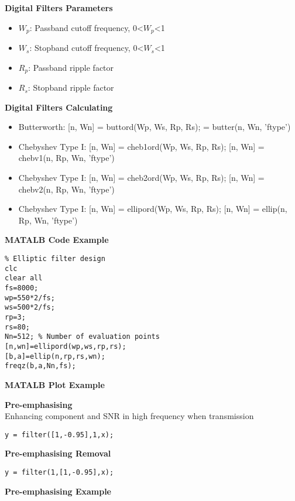 \documentclass[10pt,a4paper,oneside]{beamer}
\begin{document}
\begin{frame}
\vspace{0.5cm}
{\bfseries Digital Filters Parameters}
\begin{itemize}
\item $W_p$: Passband cutoff frequency, 0<$W_p$<1
\item $W_s$: Stopband cutoff frequency, 0<$W_s$<1
\item $R_p$: Passband ripple factor
\item $R_s$: Stopband ripple factor
\end{itemize}
{\bfseries Digital Filters Calculating}
\begin{itemize}
	\item{Butterworth}: [n, Wn] = buttord(Wp, Ws, Rp, Rs);
	\newline [m, Wn] = butter(n, Wn, 'ftype')
	\item Chebyshev Type I: [n, Wn] = cheb1ord(Wp, Ws, Rp, Rs);  
	[n, Wn] = chebv1(n, Rp, Wn, 'ftype')
	\item Chebyshev Type I: [n, Wn] = cheb2ord(Wp, Ws, Rp, Rs); 
	[n, Wn] = chebv2(n, Rp, Wn, 'ftype')
	\item Chebyshev Type I: [n, Wn] = ellipord(Wp, Ws, Rp, Rs); 
	[n, Wn] = ellip(n, Rp, Wn, 'ftype')
\end{itemize}
\end{frame}
\begin{frame}[fragile]
\vspace{0.5cm}
{\bfseries MATALB Code Example} 
\vspace{0.5cm}
\begin{lstlisting}
% Elliptic filter design
clc
clear all
fs=8000;
wp=550*2/fs;
ws=500*2/fs;        
rp=3;
rs=80;
Nn=512; % Number of evaluation points
[n,wn]=ellipord(wp,ws,rp,rs);
[b,a]=ellip(n,rp,rs,wn);
freqz(b,a,Nn,fs);
\end{lstlisting}
\end{frame}
\begin{frame}
\vspace{1.5cm}
{\bfseries MATALB Plot Example} 

\end{frame}
\begin{frame}[fragile]
\vspace{0.5cm}
{\bfseries Pre-emphasising} 
\vspace{0.5cm}
\\Enhancing component and SNR in high frequency when transmission
\begin{lstlisting}
y = filter([1,-0.95],1,x);  
\end{lstlisting}
\vspace{0.5cm}
{\bfseries  Pre-emphasising Removal} 
\begin{lstlisting}
y = filter(1,[1,-0.95],x);  
\end{lstlisting}
\end{frame}
\begin{frame}
\vspace{0.5cm}
{\bfseries Pre-emphasising Example} 

\end{frame}
\end{document}
